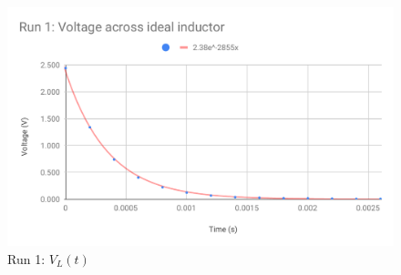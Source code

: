 \begin{figure}[ht]
    \centering
    \includegraphics[scale=0.74]{image/05-RC-RL/run-1-vL.pdf}
    \caption{Run 1: $V_{L}(t)$}
    \label{figure.05.run.1.vL}
\end{figure}